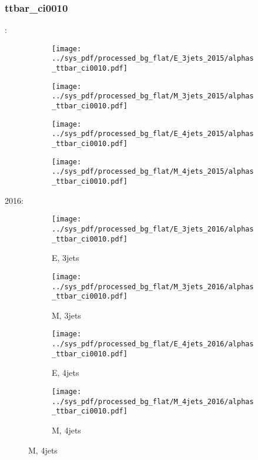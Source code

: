 \documentclass{beamer}
\begin{document}
\begin{frame}
\frametitle{ttbar_ci0010}
\fontsize{5}{1}:
\begin{figure}
\centering
\begin{subfigure}[b]{0.24\textwidth}
\texttt{[image: ../sys\_pdf/processed\_bg\_flat/E\_3jets\_2015/alphas\_ttbar\_ci0010.pdf]}
\end{subfigure}
\begin{subfigure}[b]{0.24\textwidth}
\texttt{[image: ../sys\_pdf/processed\_bg\_flat/M\_3jets\_2015/alphas\_ttbar\_ci0010.pdf]}
\end{subfigure}
\begin{subfigure}[b]{0.24\textwidth}
\texttt{[image: ../sys\_pdf/processed\_bg\_flat/E\_4jets\_2015/alphas\_ttbar\_ci0010.pdf]}
\end{subfigure}
\begin{subfigure}[b]{0.24\textwidth}
\texttt{[image: ../sys\_pdf/processed\_bg\_flat/M\_4jets\_2015/alphas\_ttbar\_ci0010.pdf]}
\end{subfigure}
\end{figure}
2016:
\begin{figure}
\centering
\begin{subfigure}[b]{0.24\textwidth}
\texttt{[image: ../sys\_pdf/processed\_bg\_flat/E\_3jets\_2016/alphas\_ttbar\_ci0010.pdf]}
\captionsetup{font=tiny}
\caption{E, 3jets}
\end{subfigure}
\begin{subfigure}[b]{0.24\textwidth}
\texttt{[image: ../sys\_pdf/processed\_bg\_flat/M\_3jets\_2016/alphas\_ttbar\_ci0010.pdf]}
\captionsetup{font=tiny}
\caption{M, 3jets}
\end{subfigure}
\begin{subfigure}[b]{0.24\textwidth}
\texttt{[image: ../sys\_pdf/processed\_bg\_flat/E\_4jets\_2016/alphas\_ttbar\_ci0010.pdf]}
\captionsetup{font=tiny}
\caption{E, 4jets}
\end{subfigure}
\begin{subfigure}[b]{0.24\textwidth}
\texttt{[image: ../sys\_pdf/processed\_bg\_flat/M\_4jets\_2016/alphas\_ttbar\_ci0010.pdf]}
\captionsetup{font=tiny}
\caption{M, 4jets}
\end{subfigure}
\end{figure}
\end{frame}
\end{document}
